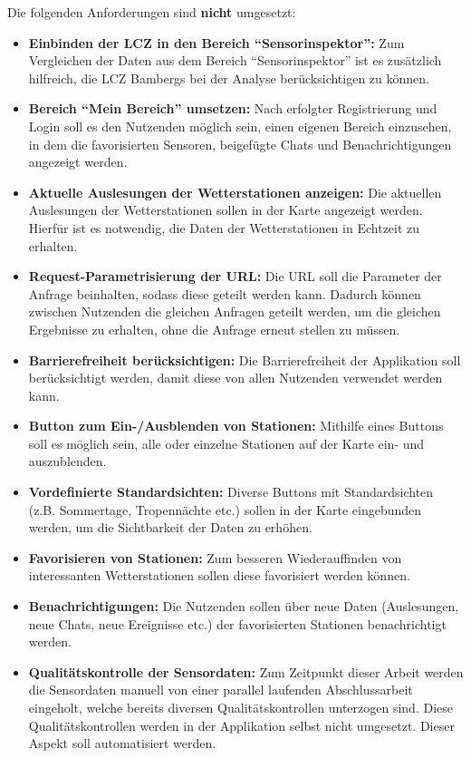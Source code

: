 Die folgenden Anforderungen sind \textbf{nicht} umgesetzt:

\begin{itemize}
    \item \textbf{Einbinden der \ac{LCZ} in den Bereich \enquote{Sensorinspektor}:} Zum Vergleichen der Daten aus dem Bereich \enquote{Sensorinspektor} ist es zusätzlich hilfreich, die \ac{LCZ} Bambergs bei der Analyse berücksichtigen zu können.
    \item \textbf{Bereich \enquote{Mein Bereich} umsetzen:} Nach erfolgter Registrierung und Login soll es den Nutzenden möglich sein, einen eigenen Bereich einzusehen, in dem die favorisierten Sensoren, beigefügte Chats und Benachrichtigungen angezeigt werden.
    \item \textbf{Aktuelle Auslesungen der Wetterstationen anzeigen:} Die aktuellen Auslesungen der Wetterstationen sollen in der Karte angezeigt werden. Hierfür ist es notwendig, die Daten der Wetterstationen in Echtzeit zu erhalten.
    \item \textbf{Request-Parametrisierung der URL:} Die URL soll die Parameter der Anfrage beinhalten, sodass diese geteilt werden kann. Dadurch können zwischen Nutzenden die gleichen Anfragen geteilt werden, um die gleichen Ergebnisse zu erhalten, ohne die Anfrage erneut stellen zu müssen.
    \item \textbf{Barrierefreiheit berücksichtigen:} Die Barrierefreiheit der Applikation soll berücksichtigt werden, damit diese von allen Nutzenden verwendet werden kann.
    \item \textbf{Button zum Ein-/Ausblenden von Stationen:} Mithilfe eines Buttons soll es möglich sein, alle oder einzelne Stationen auf der Karte ein- und auszublenden.
    \item \textbf{Vordefinierte Standardsichten:} Diverse Buttons mit Standardsichten (z.B. Sommertage, Tropennächte etc.) sollen in der Karte eingebunden werden, um die Sichtbarkeit der Daten zu erhöhen.
    \item \textbf{Favorisieren von Stationen:} Zum besseren Wiederauffinden von interessanten Wetterstationen sollen diese favorisiert werden können.
    \item \textbf{Benachrichtigungen:} Die Nutzenden sollen über neue Daten (Auslesungen, neue Chats, neue Ereignisse etc.) der favorisierten Stationen benachrichtigt werden.
    \item \textbf{Qualitätskontrolle der Sensordaten:} Zum Zeitpunkt dieser Arbeit werden die Sensordaten manuell von einer parallel laufenden Abschlussarbeit eingeholt, welche bereits diversen Qualitätskontrollen unterzogen sind. Diese Qualitätskontrollen werden in der Applikation selbst nicht umgesetzt. Dieser Aspekt soll automatisiert werden. 
\end{itemize}

